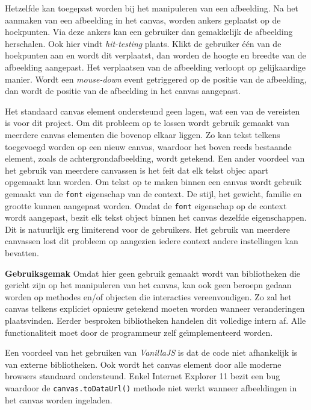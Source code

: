 Hetzelfde kan toegepast worden bij het manipuleren van een afbeelding. Na het aanmaken van een afbeelding in het canvas, worden ankers geplaatst op de hoekpunten. Via deze ankers kan een gebruiker dan gemakkelijk de afbeelding herschalen. Ook hier vindt \textit{hit-testing} plaats. Klikt de gebruiker \'{e}\'{e}n van de hoekpunten aan en wordt dit verplaatst, dan worden de hoogte en breedte van de afbeelding aangepast. Het verplaatsen van de afbeelding verloopt op gelijkaardige manier. Wordt een \textit{mouse-down} event getriggered op de positie van de afbeelding, dan wordt de positie van de afbeelding in het canvas aangepast. 


Het standaard canvas element ondersteund geen lagen, wat een van de vereisten is voor dit project. Om dit probleem op te lossen wordt gebruik gemaakt van meerdere canvas elementen die bovenop elkaar liggen. Zo kan tekst telkens toegevoegd worden op een nieuw canvas, waardoor het boven reeds bestaande element, zoals de achtergrondafbeelding, wordt getekend. Een ander voordeel van het gebruik van meerdere canvassen is het feit dat elk tekst objec apart opgemaakt kan worden. Om tekst op te maken binnen een canvas wordt gebruik gemaakt van de \texttt{font} eigenschap van de context. De stijl, het gewicht, familie en grootte kunnen aangepast worden. Omdat de \texttt{font} eigenschap op de context wordt aangepast, bezit elk tekst object binnen het canvas dezelfde eigenschappen. Dit is natuurlijk erg limiterend voor de gebruikers. Het gebruik van meerdere canvassen lost dit probleem op aangezien iedere context andere instellingen kan bevatten.  

\textbf{Gebruiksgemak} \break
Omdat hier geen gebruik gemaakt wordt van bibliotheken die gericht zijn op het manipuleren van het canvas, kan ook geen beroepn gedaan worden op methodes en/of objecten die interacties vereenvoudigen. Zo zal het canvas telkens expliciet opnieuw getekend moeten worden wanneer veranderingen plaatsvinden. Eerder besproken bibliotheken handelen dit volledige intern af. Alle functionaliteit moet door de programmeur zelf ge\"{\i}mplementeerd worden. 

Een voordeel van het gebruiken van \textit{VanillaJS} is dat de code niet afhankelijk is van externe bibliotheken. Ook wordt het canvas element door alle moderne browsers standaard ondersteund. Enkel Internet Explorer 11 bezit een bug waardoor de  \texttt{canvas.toDataUrl()} methode niet werkt wanneer afbeeldingen in het canvas worden ingeladen. %

